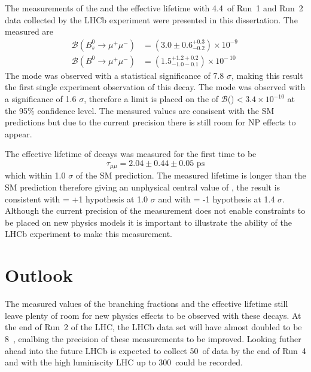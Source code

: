 The measurements of the \bmumu \BF and the \bsmumu effective lifetime with 4.4~\fb of Run~1 and Run~2 data collected by the LHCb experiment were presented in this dissertation. The measured \BFs are
\begin{equation}
\begin{split}
  \mathcal{B}(B^{0}_{s} \to \mu^{+} \mu^{-}) &= (3.0 \pm 0.6^{+0.3}_{-0.2}) \times 10^{-9\
} \\
  \mathcal{B}(B^{0} \to \mu^{+} \mu^{-}) &= (1.5^{+1.2 +0.2}_{-1.0 -0.1})    \times 10^{-\
10}
\end{split}
\label{eq:BFresults2}
\end{equation}
The \bs mode was observed with a statistical significance of 7.8 $\sigma$, making this result the first single experiment observation of this decay. The \bd mode was observed with a significance of 1.6 $\sigma$, therefore a limit is placed on the \BF of $\mathcal{B}$(\bdmumu)$ < 3.4 \times 10^{-10}$ at the 95$\%$ confidence level. The measured values are consisent with the SM predictions but due to the current precision there is still room for NP effects to appear. %


The effective lifetime of \bsmumu decays was measured for the first time to be 
\begin{equation}
\tau_{\mu\mu} = 2.04 \pm 0.44 \pm 0.05 \text{ ps}
\end{equation}
which within 1.0 $\sigma$ of the SM prediction. The measured lifetime is longer than the SM prediction therefore giving an unphysical central value of \ADG, the result is consistent with \ADG = +1 hypothesis at 1.0 $\sigma$ and with \ADG = -1 hypothesis at 1.4 $\sigma$. Although the current precision of the measurement does not enable constraints to be placed on new physics models it is important to illustrate the ability of the LHCb experiment to make this measurement.


\section{Outlook}
The measured values of the branching fractions and the effective lifetime still leave plenty of room for new physics effects to be observed with these decays. At the end of Run~2 of the LHC, the LHCb data set will have almost doubled to be 8~\fb, enalbing the precision of these measurements to be improved. Looking futher ahead into the future LHCb is expected to collect 50~\fb of data by the end of Run~4 and with the high luminiscity LHC up to 300~\fb could be recorded. 


